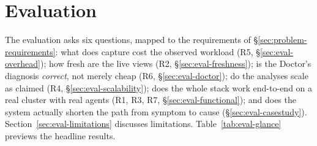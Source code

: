 \chapter{Evaluation}
\label{chap:evaluation}


The evaluation asks six questions, mapped to the requirements of
\S\ref{sec:problem-requirements}: what does capture cost the observed
workload (R5, \S\ref{sec:eval-overhead}); how fresh are the live views
(R2, \S\ref{sec:eval-freshness}); is the Doctor's diagnosis
\emph{correct}, not merely cheap (R6, \S\ref{sec:eval-doctor}); do the
analyses scale as claimed (R4,
\S\ref{sec:eval-scalability}); does the whole stack work end-to-end on a
real cluster with real agents (R1, R3, R7,
\S\ref{sec:eval-functional}); and does the system actually shorten the
path from symptom to cause (\S\ref{sec:eval-casestudy}).
Section~\ref{sec:eval-limitations} discusses limitations.
Table~\ref{tab:eval-glance} previews the headline results.


